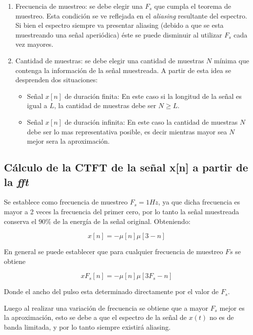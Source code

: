 \documentclass[11pt,a4paper]{article}
\begin{document}
\begin{enumerate}      
\item Frecuencia de muestreo: se debe elegir una $F_s$ que cumpla el teorema de muestreo. Esta condición se ve reflejada en el \textit{aliasing} resultante del espectro. Si bien el espectro siempre va presentar aliasing (debido a que se esta muestreando una señal aperiódica) éste se puede disminuir al utilizar $F_s$ cada vez mayores.      
\item Cantidad de muestras: se debe elegir una cantidad de muestras $N$ mínima que contenga la información de la señal muestreada. A partir de esta idea se desprenden dos situaciones:      

\begin{itemize}          
\item Señal $x[n]$ de duración finita: En este caso si la longitud de la señal es igual a $L$, la cantidad de muestras debe ser $N \geq L$.          
\item Señal $x[n]$ de duración infinita: En este caso la cantidad de muestras $N$ debe ser lo mas representativa posible, es decir mientras mayor sea $N$ mejor sera la aproximación.     
\end{itemize} 
\end{enumerate}


\subsection{Cálculo de la CTFT de la señal x[n] a partir de la \textit{fft}}

Se establece como frecuencia de muestreo $F_s=1Hz$, ya que dicha frecuencia es mayor a 2 veces la frecuencia del primer cero, por lo tanto la señal
muestreada conserva el $90\%$ de la energía de la señal original. Obteniendo:

\begin{equation}
    x[n]=-\mu[n]\mu[3-n]
\end{equation}

En general se puede establecer que para cualquier frecuencia de muestreo $Fs$ se obtiene 

\begin{equation}
    x{F_s}[n]=-\mu[n]\mu[3F_s-n]
\end{equation}

Donde el ancho del pulso esta determinado directamente por el valor de $F_s$.

Luego al realizar una variación de frecuencia se obtiene que a mayor $F_s$ mejor es la aproximación, esto se debe a que el espectro de la 
señal de $x(t)$ no es de banda limitada, y por lo tanto siempre existirá aliasing.
\end{document}
